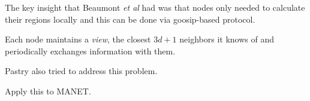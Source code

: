 \documentclass{IEEEtran}
\begin{document}
The key insight that Beaumont \textit{et al} had  was that nodes only needed to calculate their regions locally and this can be done via goosip-based protocol.

Each node maintains a \textit{view}, the closest $3d+1$ neighbors it knows of and periodically exchanges information with them.


Pastry also tried to address this problem.


Apply this to MANET.




\end{document}
